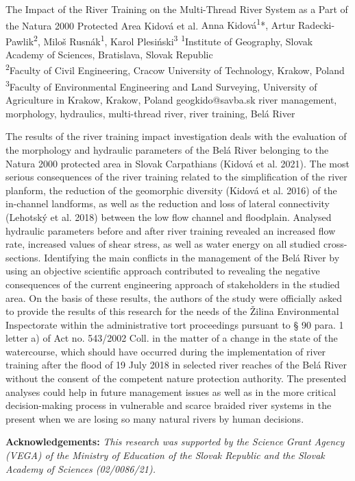 \abstract
{The Impact of the River Training on the Multi-Thread River System as a Part of the Natura 2000 Protected Area} 
{Kidová et al.} 
{Anna Kidová\textsuperscript{1}*, Artur Radecki-Pawlik\textsuperscript{2}, Miloš Rusnák\textsuperscript{1}, Karol Plesiński\textsuperscript{3}} 
{\TLtag} 
{
	\textsuperscript{1}Institute of Geography, Slovak Academy of Sciences, Bratislava, Slovak Republic\\
	\textsuperscript{2}Faculty of Civil Engineering, Cracow University of Technology, Krakow, Poland\\
	\textsuperscript{3}Faculty of Environmental Engineering and Land Surveying, University of Agriculture in Krakow, Krakow, Poland
}
{geogkido@savba.sk}  %
{river management, morphology, hydraulics, multi-thread river, river training, Belá River}
{The results of the river training impact investigation deals with the evaluation of the morphology and hydraulic parameters of the Belá River belonging to the Natura 2000 protected area in Slovak Carpathians (Kidová et al. 2021). The most serious consequences of the river training related to the simplification of the river planform, the reduction of the geomorphic diversity (Kidová et al. 2016) of the in-channel landforms, as well as the reduction and loss of lateral connectivity (Lehotský et al. 2018) between the low flow channel and floodplain. Analysed hydraulic parameters before and after river training revealed an increased flow rate, increased values of shear stress, as well as water energy on all studied cross-sections. Identifying the main conflicts in the management of the Belá River by using an objective scientific approach contributed to revealing the negative consequences of the current engineering approach of stakeholders in the studied area. On the basis of these results, the authors of the study were officially asked to provide the results of this research for the needs of the Žilina Environmental Inspectorate within the administrative tort proceedings pursuant to § 90 para. 1 letter a) of Act no. 543/2002 Coll. in the matter of a change in the state of the watercourse, which should have occurred during the implementation of river training after the flood of 19 July 2018 in selected river reaches of the Belá River without the consent of the competent nature protection authority. The presented analyses could help in future management issues as well as in the more critical decision-making process in vulnerable and scarce braided river systems in the present when we are losing so many natural rivers by human decisions.

\vspace{0.5em}
\noindent
\textbf{Acknowledgements:}
\textit{This research was supported by the Science Grant Agency (VEGA) of the Ministry of Education of the Slovak Republic and the Slovak Academy of Sciences (02/0086/21).}
}
